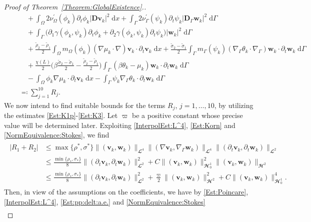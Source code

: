 \documentclass[10pt,reqno]{amsart}
\theoremstyle{remark}
\numberwithin{equation}{section}
\newcommand{\abs}[1]{| #1 |}
\newcommand{\norm}[1]{\| #1 \|}
\newcommand{\bv}{\mathbf{v}}
\newcommand{\bw}{\mathbf{w}}
\newcommand{\D}{\mathbf{D}}
\newcommand{\Dg}{\mathbf{D}_\Gamma}
\newcommand{\intO}{\int_\Omega}
\newcommand{\intG}{\int_\Gamma}
\newcommand{\dx}{\;\mathrm{d}x}
\newcommand{\dG}{\;\mathrm d\Ga}
\newcommand{\del}{\partial}
\newcommand{\delt}{\partial_{t}}
\newcommand{\Grad}{\nabla}
\newcommand{\Gradg}{\nabla_\Ga}
\newcommand{\Om}{\Omega}
\newcommand{\Ga}{\Gamma}
\begin{document}
\begin{proof}[Proof of Theorem~\ref{Theorem:GlobalExistence}.]
\begin{align}
    &\qquad + \intO 2\nu_\Om^\prime(\phi_k)\delt\phi_k\abs{\D\bv_k}^2\dx + \intG 2\nu_\Ga^\prime(\psi_k)\delt\psi_k\abs{\Dg\bw_k}^2\dG \nonumber \\
    &\qquad + \intG \big(\del_1\gamma(\phi_k,\psi_k)\delt\phi_k + \del_2\gamma(\phi_k,\psi_k)\delt\psi_k\big)\abs{\bw_k}^2\dG \\
    &\qquad + \frac{\tilde\rho_2 - \tilde\rho_1}{2}\intO m_\Om(\phi_k)(\Grad\mu_k\cdot\Grad)\bv_k\cdot\delt\bv_k\dx + \frac{\tilde\sigma_2 - \tilde\sigma_1}{2}\intG m_\Ga(\psi_k)(\Gradg\theta_k\cdot\Gradg)\bw_k\cdot\delt\bw_k\dG \nonumber \\
    &\qquad + \frac{\chi(L)}{2}\Big(\beta\frac{\tilde\sigma_2 - \tilde\sigma_1}{2} - \frac{\tilde\rho_2 - \tilde\rho_1}{2}\Big)\intG (\beta\theta_k - \mu_k)\bw_k\cdot\delt\bw_k\dG \nonumber \\
    &\qquad - \intO \phi_k\Grad\mu_k\cdot\delt\bv_k\dx - \intG \psi_k\Gradg\theta_k\cdot\delt\bw_k\dG \nonumber \\
    &\quad \eqqcolon \sum_{j=1}^{10}R_j. \nonumber
\end{align}
We now intend to find suitable bounds for the terms $R_j$, $j=1,\ldots,10$, by utilizing the estimates \eqref{Est:K1p}-\eqref{Est:K3}. Let $\varpi$ be a positive constant whose precise value will be determined later. Exploiting \eqref{InterpolEst:L^4}, \eqref{Est:Korn} and \eqref{NormEquivalence:Stokes}, we find
\begin{align}\label{Est:R1R2}
    \begin{split}
        \abs{R_1 + R_2} &\leq \max\{\rho^\ast,\sigma^\ast\}\norm{(\bv_k,\bw_k)}_{\mathbfcal{L}^4}\norm{(\Grad\bv_k,\Gradg\bw_k)}_{\mathbfcal{L}^4}\norm{(\delt\bv_k,\delt\bw_k)}_{\mathbfcal{L}^2} \\
        &\leq \frac{\min\{\rho_\ast,\sigma_\ast\}}{8}\norm{(\delt\bv_k,\delt\bw_k)}_{\mathbfcal{L}^2}^2 + C\norm{(\bv_k,\bw_k)}_{\mathbfcal{H}^1_{0}}^2\norm{(\bv_k,\bw_k)}_{\mathbfcal{H}^2} \\
        &\leq \frac{\min\{\rho_\ast,\sigma_\ast\}}{8}\norm{(\delt\bv_k,\delt\bw_k)}_{\mathbfcal{L}^2}^2 + \frac{\varpi}{2}\norm{(\bv_k,\bw_k)}_{\mathbfcal{H}^2}^2 + C\norm{(\bv_k,\bw_k)}_{\mathbfcal{H}^1_{0}}^4.
    \end{split}
\end{align}
Then, in view of the assumptions on the coefficients, we have by \eqref{Est:Poincare}, \eqref{InterpolEst:L^4}, \eqref{Est:pp:delt:a.e.} and \eqref{NormEquivalence:Stokes}
\begin{align}\label{Est:R3R4R5}

\end{align}
\end{proof}
\end{document}
